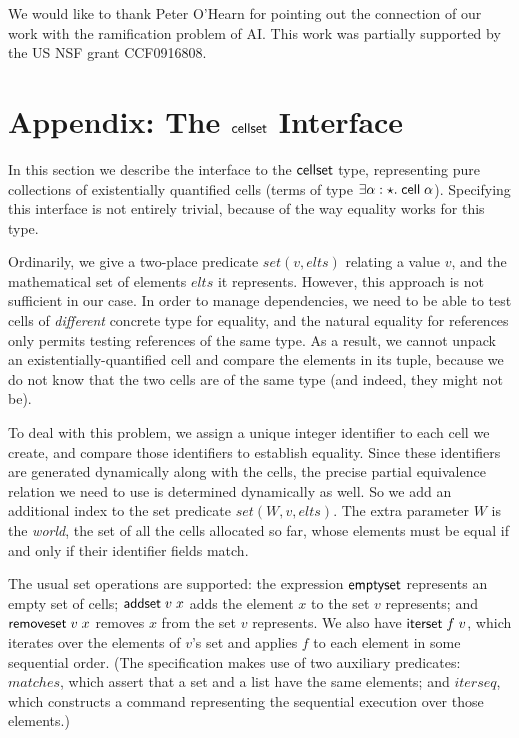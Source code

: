 \documentclass[natbib]{sigplanconf}
\begin{document}
\acks We would like to thank Peter O'Hearn for pointing out the connection
of our work with the ramification problem of AI. This work was
partially supported by the US NSF grant CCF0916808.

{}


% 
% 
% 
% 

\appendix

\section{Appendix: The $\mbox{\textsf{{cellset}}}$ Interface}

In this section we describe the interface to the $\mbox{\textsf{{cellset}}}$ type,
representing pure collections of existentially quantified cells
(terms of type $\exists \alpha:\star.\;
\mbox{\textsf{{cell}}}\;{\alpha}$). Specifying this interface is not entirely
trivial, because of the way equality works for this type. 

Ordinarily, we give a two-place predicate $set(v, elts)$ relating a
value $v$, and the mathematical set of elements $elts$ it represents.
However, this approach is not sufficient in our case. In order to
manage dependencies, we need to be able to test cells of
\emph{different} concrete type for equality, and the natural equality
for references only permits testing references of the same type. As a
result, we cannot unpack an existentially-quantified cell and compare
the elements in its tuple, because we do not know that the two cells
are of the same type (and indeed, they might not be). 

To deal with this problem, we assign a unique integer identifier to
each cell we create, and compare those identifiers to establish
equality. Since these identifiers are generated dynamically along with
the cells, the precise partial equivalence relation we need to use is
determined dynamically as well. So we add an additional index to the
set predicate $set(W, v, elts)$. The extra parameter $W$ is the
\emph{world}, the set of all the cells allocated so far, whose
elements must be equal if and only if their identifier fields match.

The usual set operations are supported: the expression
$\mbox{\textsf{{emptyset}}}$ represents an empty set of cells; 
$\mbox{\textsf{{addset}}}\;v\;x$ adds the element $x$ to the set $v$
represents; and $\mbox{\textsf{{removeset}}}\;v\;x$ removes $x$ from the
set $v$ represents. We also have $\mbox{\textsf{{iterset}}}\;f\;v$, which
iterates over the elements of $v$'s set and applies $f$ to each
element in some sequential order. (The specification
makes use of two auxiliary predicates: $\mathit{matches}$, which assert that a
set and a list have the same elements; and $\mathit{iterseq}$, which constructs
a command representing the sequential execution over those elements.)
\end{document}
